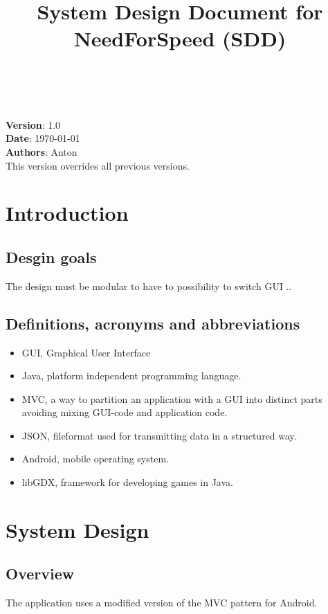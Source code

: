 \documentclass{article}
\begin{document}
\title{System Design Document for NeedForSpeed (SDD)}
\author{}
\date{}
\maketitle

\tableofcontents

\noindent
\\
\\
\textbf{Version}: 1.0 \\
\textbf{Date}: \today \\
\textbf{Authors}: Anton \\
This version overrides all previous versions.

\section{Introduction}
\subsection{Desgin goals}
The design must be modular to have to possibility to switch GUI ..

\subsection{Definitions, acronyms and abbreviations}
\begin{itemize}
  \item GUI, Graphical User Interface
  \item Java, platform independent programming language.
  \item MVC, a way to partition an application with a GUI into distinct parts avoiding
  mixing GUI-code and application code.
  \item JSON, fileformat used for transmitting data in a structured way.
  \item Android, mobile operating system. 
  \item libGDX, framework for developing games in Java.
\end{itemize}

\section{System Design}
\subsection{Overview}
The application uses a modified version of the MVC pattern for Android.
\end{document}
